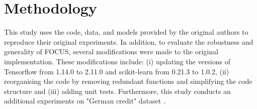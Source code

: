 




\section{Methodology}
This study uses the code, data, and models provided by the original authors to reproduce their original experiments. In addition, to evaluate the robustness and generality of FOCUS, several modifications were made to the original implementation. These modifications include: (i) updating the versions of Tensorflow from 1.14.0 to 2.11.0 and scikit-learn from 0.21.3 to 1.0.2, (ii) reorganising the code by removing redundant functions and simplifying the code structure and (iii) adding unit tests. Furthermore, this study conducts an additional experiments on "German credit" dataset \cite{Dua:2019}.

